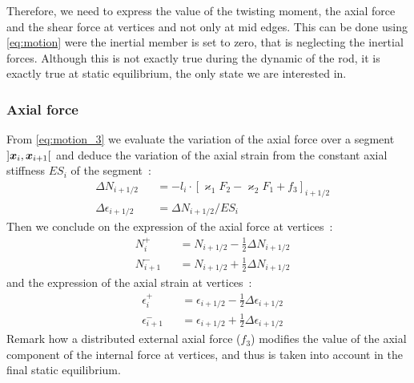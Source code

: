 Therefore, we need to express the value of the twisting moment, the axial force and the shear force at vertices and not only at mid edges. This can be done using \cref{eq:motion} were the inertial member is set to zero, that is neglecting the inertial forces. Although this is not exactly true during the dynamic of the rod, it is exactly true at static equilibrium, the only state we are interested in.

\subsubsection{Axial force}
From \cref{eq:motion_3} we evaluate the variation of the axial force over a segment $]\boldsymbol{x}_{i},  \boldsymbol{x}_{i+1}[$ and deduce the variation of the axial strain from the constant axial stiffness $ES_i$ of the segment~:
\begin{subequations}
	\begin{alignat}{2}
		&\Delta N_{i+1/2} &&= -l_i  \cdot {[\varkappa_1 F_2 - \varkappa_2 F_1 + f_3]}_{i+1/2}
		\label{eq:DeltaN}
		\\
		&\Delta \epsilon_{i+1/2} &&= \Delta N_{i+1/2} / {ES}_i
	\end{alignat}
\end{subequations}
Then we conclude on the expression of the axial force at vertices~:
\begin{subequations}
	\begin{alignat}{2}
		&N_{i}^{+} &&= N_{i+1/2} - \frac{1}{2} \Delta N_{i+1/2}  \\[0.5em]
		&N_{i+1}^{-} &&= N_{i+1/2} + \frac{1}{2} \Delta N_{i+1/2}
	\end{alignat}
	\label{eq:dNi}
\end{subequations}
and the expression of the axial strain at vertices~:
\begin{subequations}
	\begin{alignat}{2}
		&\epsilon_{i}^{+} &&= \epsilon_{i+1/2} - \frac{1}{2} \Delta \epsilon_{i+1/2}  \\[0.5em]
		&\epsilon_{i+1}^{-} &&= \epsilon_{i+1/2} + \frac{1}{2} \Delta \epsilon_{i+1/2}
	\end{alignat}
\end{subequations}
Remark how a distributed external axial force (${f}_3$) modifies the value of the axial component of the internal force at vertices, and thus is taken into account in the final static equilibrium.

